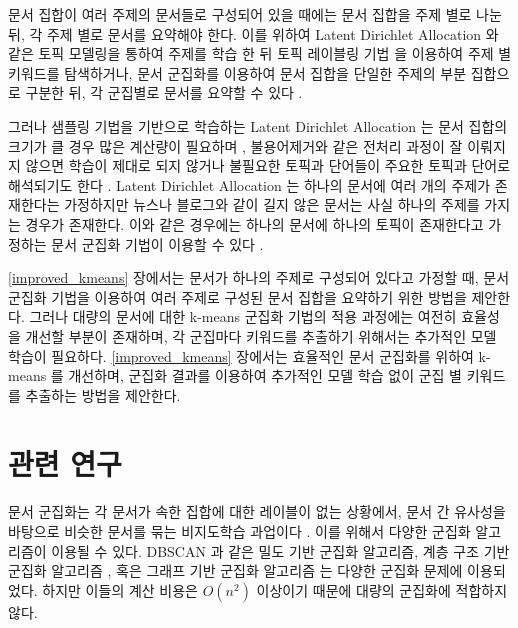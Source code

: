 \documentclass[oneside, ko,phd]{snuthesis_utf8_kor}
\begin{document}
문서 집합이 여러 주제의 문서들로 구성되어 있을 때에는 문서 집합을 주제 별로 나눈 뒤, 각 주제 별로 문서를 요약해야 한다.
이를 위하여 Latent Dirichlet Allocation \cite{blei2003latent} 와 같은 토픽 모델링을 통하여 주제를 학습 한 뒤 토픽 레이블링 기법 \cite{sievert2014ldavis} 을 이용하여 주제 별 키워드를 탐색하거나, 문서 군집화를 이용하여 문서 집합을 단일한 주제의 부분 집합으로 구분한 뒤, 각 군집별로 문서를 요약할 수 있다 \cite{wan2008multi, erkan2004lexpagerank, twinandilla2018multi}.

그러나 샘플링 기법을 기반으로 학습하는 Latent Dirichlet Allocation 는 문서 집합의 크기가 클 경우 많은 계산량이 필요하며 \cite{yuan2015lightlda}, 불용어제거와 같은 전처리 과정이 잘 이뤄지지 않으면 학습이 제대로 되지 않거나 불필요한 토픽과 단어들이 주요한 토픽과 단어로 해석되기도 한다 \cite{darling2011theoretical, newman2010evaluating}.
Latent Dirichlet Allocation 는 하나의 문서에 여러 개의 주제가 존재한다는 가정하지만 뉴스나 블로그와 같이 길지 않은 문서는 사실 하나의 주제를 가지는 경우가 존재한다.
이와 같은 경우에는 하나의 문서에 하나의 토픽이 존재한다고 가정하는 문서 군집화 기법이 이용할 수 있다 \cite{dhillon2001concept, xu2003document, xie2013integrating}.

\ref{improved_kmeans} 장에서는 문서가 하나의 주제로 구성되어 있다고 가정할 때, 문서 군집화 기법을 이용하여 여러 주제로 구성된 문서 집합을 요약하기 위한 방법을 제안한다.
그러나 대량의 문서에 대한 k-means 군집화 기법의 적용 과정에는 여전히 효율성을 개선할 부분이 존재하며, 각 군집마다 키워드를 추출하기 위해서는 추가적인 모델 학습이 필요하다.
\ref{improved_kmeans} 장에서는 효율적인 문서 군집화를 위하여 k-means 를 개선하며, 군집화 결과를 이용하여 추가적인 모델 학습 없이 군집 별 키워드를 추출하는 방법을 제안한다.

\section{관련 연구}

문서 군집화는 각 문서가 속한 집합에 대한 레이블이 없는 상황에서, 문서 간 유사성을 바탕으로 비슷한 문서를 묶는 비지도학습 과업이다 \cite{xu2015comprehensive, yang2017towards, xie2016unsupervised}.
이를 위해서 다양한 군집화 알고리즘이 이용될 수 있다.
DBSCAN \cite{ester1996density}과 같은 밀도 기반 군집화 알고리즘, 계층 구조 기반 군집화 알고리즘 \cite{sibson1973slink}, 혹은 그래프 기반 군집화 알고리즘 \cite{clauset2004finding} 는 다양한 군집화 문제에 이용되었다.
하지만 이들의 계산 비용은 $O(n^2)$ 이상이기 때문에 대량의 군집화에 적합하지 않다.
\end{document}
